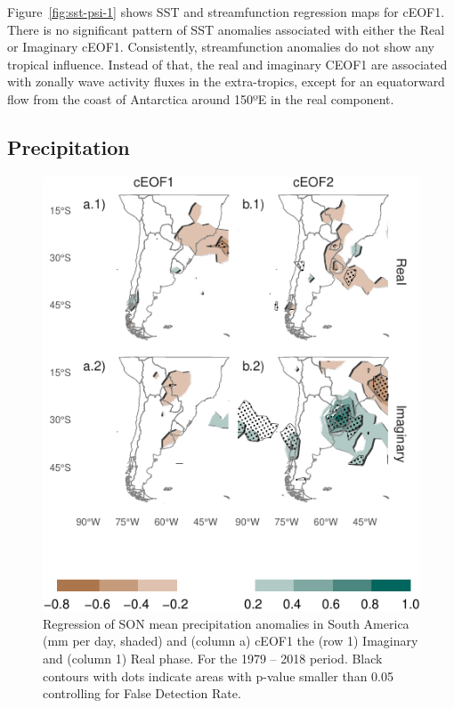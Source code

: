 \documentclass[smallextended]{svjour3}       %
\begin{document}
Figure~\ref{fig:sst-psi-1} shows SST and streamfunction regression maps for cEOF1. There is no significant pattern of SST anomalies associated with either the Real or Imaginary cEOF1. Consistently, streamfunction anomalies do not show any tropical influence. Instead of that, the real and imaginary CEOF1 are associated with zonally wave activity fluxes in the extra-tropics, except for an equatorward flow from the coast of Antarctica around 150ºE in the real component.

\hypertarget{precipitation}{%
\subsection{Precipitation}\label{precipitation}}



\begin{figure}
\centering
\includegraphics{../figures/pp-america-1.pdf}
\caption{\label{fig:pp-america}Regression of SON mean precipitation anomalies in South America (mm per day, shaded) and (column a) cEOF1 the (row 1) Imaginary and (column 1) Real phase. For the 1979 -- 2018 period. Black contours with dots indicate areas with p-value smaller than 0.05 controlling for False Detection Rate.}
\end{figure}
\end{document}
